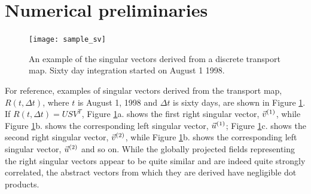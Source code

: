 \section{Numerical preliminaries}

\begin{figure}
  \texttt{[image: sample\_sv]}
  \caption{An example of the singular vectors derived from a discrete transport map.
  Sixty day integration started on August 1 1998.}
  \label{sample_SV}
\end{figure}

For reference, examples of singular vectors derived from the transport map,
$R(t, \Delta t)$, where $t$ is August 1, 1998 and $\Delta t$ is sixty days,
are shown in Figure \ref{sample_SV}.
If $R(t, \Delta t)=U S V^T$,
Figure \ref{sample_SV}a. shows the first right singular vector, $\vec v^{(1)}$,
while Figure \ref{sample_SV}b. shows the corresponding left singular vector,
$\vec u^{(1)}$;
Figure \ref{sample_SV}c. shows the second right singular vector, $\vec v^{(2)}$,
while Figure \ref{sample_SV}b. shows the corresponding left singular vector,
$\vec u^{(2)}$
and so on.
While the globally projected fields representing the right singular vectors 
appear to be quite similar and are indeed
quite strongly correlated, the abstract vectors from which they are derived
have negligible dot products.

